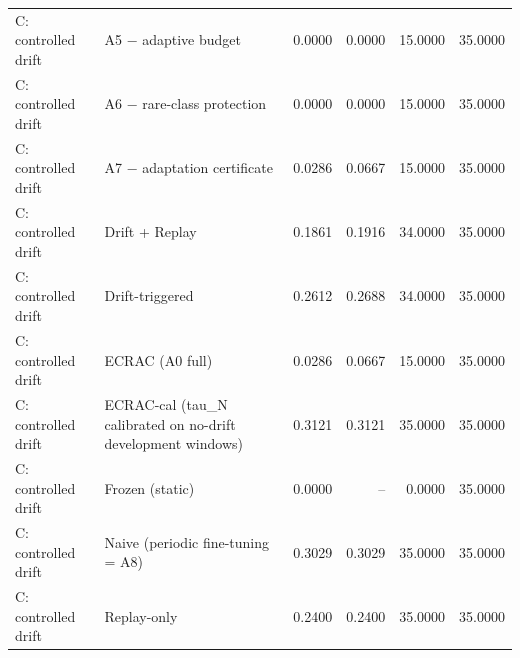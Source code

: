 \begin{table}[t]
\begin{tabular}{llrrrr}
C: controlled drift & A5 − adaptive budget & 0.0000 & 0.0000 & 15.0000 & 35.0000 \\
C: controlled drift & A6 − rare-class protection & 0.0000 & 0.0000 & 15.0000 & 35.0000 \\
C: controlled drift & A7 − adaptation certificate & 0.0286 & 0.0667 & 15.0000 & 35.0000 \\
C: controlled drift & Drift + Replay & 0.1861 & 0.1916 & 34.0000 & 35.0000 \\
C: controlled drift & Drift-triggered & 0.2612 & 0.2688 & 34.0000 & 35.0000 \\
C: controlled drift & ECRAC (A0 full) & 0.0286 & 0.0667 & 15.0000 & 35.0000 \\
C: controlled drift & ECRAC-cal (tau\_N calibrated on no-drift development windows) & 0.3121 & 0.3121 & 35.0000 & 35.0000 \\
C: controlled drift & Frozen (static) & 0.0000 & -- & 0.0000 & 35.0000 \\
C: controlled drift & Naive (periodic fine-tuning = A8) & 0.3029 & 0.3029 & 35.0000 & 35.0000 \\
C: controlled drift & Replay-only & 0.2400 & 0.2400 & 35.0000 & 35.0000 \\
\bottomrule
\end{tabular}
\end{table}